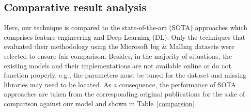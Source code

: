 \documentclass[pdflatex,sn-mathphys]{sn-jnl}%
\begin{document}
\subsection{Comparative result analysis}
\label{SOTA}
Here, our technique is compared to the state-of-the-art (SOTA) approaches which comprises feature engineering and Deep Learning (DL). Only the techniques that evaluated their methodology using the Microsoft big \& MalImg datasets were selected to ensure fair comparison.
Besides, in the majority of situations, the existing models and their implementations are not available online or do not function properly, e.g., the parameters must be tuned for the dataset and missing libraries may need to be located. As a consequence, the performance of SOTA approaches are taken from the corresponding original publications for the sake of comparison against our model and shown in 
Table~\ref{comparsion}. 
\end{document}
